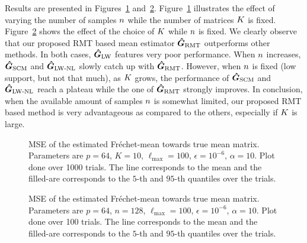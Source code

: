 Results are presented in Figures~\ref{fig:Mean:mse_nsamples} and~\ref{fig:Mean:mse_nmatrices}.
Figure~\ref{fig:Mean:mse_nsamples} illustrates the effect of varying the number of samples $n$ while the number of matrices $K$ is fixed.
Figure~\ref{fig:Mean:mse_nmatrices} shows the effect of the choice of $K$ while $n$ is fixed.
%
We clearly observe that our proposed RMT based mean estimator $\boldsymbol{\hat{G}}_{\textup{RMT}}$ outperforms other methods.
In both cases, $\boldsymbol{\hat{G}}_{\textup{LW}}$ features very poor performance.
When $n$ increases, $\boldsymbol{\hat{G}}_{\textup{SCM}}$ and $\boldsymbol{\hat{G}}_{\textup{LW-NL}}$ slowly catch up with $\boldsymbol{\hat{G}}_{\textup{RMT}}$.
However, when $n$ is fixed (low support, but not that much), as $K$ grows, the performance of $\boldsymbol{\hat{G}}_{\textup{SCM}}$ and $\boldsymbol{\hat{G}}_{\textup{LW-NL}}$ reach a plateau while the one of $\boldsymbol{\hat{G}}_{\textup{RMT}}$ strongly improves.
%
In conclusion, when the available amount of samples $n$ is somewhat limited, our proposed RMT based method is very advantageous as compared to the others, especially if $K$ is large.

\begin{figure}
    \centering
    
    \vspace{-2em}
    \caption{MSE of the estimated Fréchet-mean towards true mean matrix. Parameters are $p=64$, $K=10$, $\ell_{\mathrm{max}}=100$, $\epsilon=10^{-6}$, $\alpha = 10$. Plot done over 1000 trials. The line corresponds to the mean and the filled-are corresponds to the $5$-th and $95$-th quantiles over the trials.}
    \label{fig:Mean:mse_nsamples}
\end{figure}

\begin{figure}
    \centering
    
    \vspace{-2em}
    \caption{MSE of the estimated Fréchet-mean towards true mean matrix. Parameters are $p=64$, $n=128$, $\ell_{\mathrm{max}}=100$, $\epsilon=10^{-6}$, $\alpha = 10$. Plot done over 100 trials. The line corresponds to the mean and the filled-are corresponds to the $5$-th and $95$-th quantiles over the trials.}
    \label{fig:Mean:mse_nmatrices}
\end{figure}


%     

